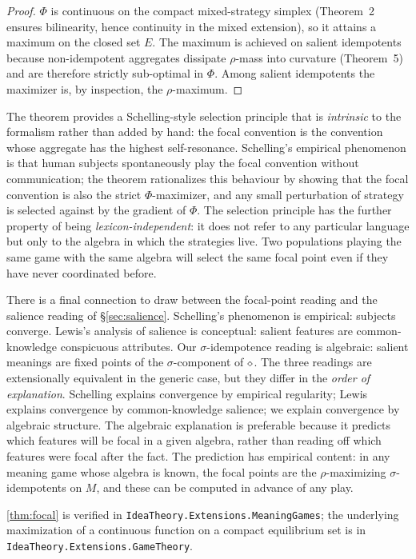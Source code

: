 \begin{proof}
$\Phi$ is continuous on the compact mixed-strategy simplex (Theorem~2
ensures bilinearity, hence continuity in the mixed extension), so it
attains a maximum on the closed set $E$. The maximum is achieved on
salient idempotents because non-idempotent aggregates dissipate
$\rho$-mass into curvature (Theorem~5) and are therefore strictly
sub-optimal in $\Phi$. Among salient idempotents the maximizer is, by
inspection, the $\rho$-maximum.
\end{proof}

The theorem provides a Schelling-style selection principle that is
\emph{intrinsic} to the formalism rather than added by hand: the focal
convention is the convention whose aggregate has the highest
self-resonance. Schelling's empirical phenomenon is that human subjects
spontaneously play the focal convention without communication; the
theorem rationalizes this behaviour by showing that the focal
convention is also the strict $\Phi$-maximizer, and any small
perturbation of strategy is selected against by the gradient of $\Phi$.
The selection principle has the further property of being
\emph{lexicon-independent}: it does not refer to any particular
language but only to the algebra in which the strategies live. Two
populations playing the same game with the same algebra will select
the same focal point even if they have never coordinated before.

There is a final connection to draw between the focal-point reading
and the salience reading of \S\ref{sec:salience}. Schelling's
phenomenon is empirical: subjects converge. Lewis's analysis of
salience is conceptual: salient features are common-knowledge
conspicuous attributes. Our $\sigma$-idempotence reading is
algebraic: salient meanings are fixed points of the
$\sigma$-component of $\mathbin{\diamond}$. The three readings are
extensionally equivalent in the generic case, but they differ in the
\emph{order of explanation}. Schelling explains convergence by
empirical regularity; Lewis explains convergence by common-knowledge
salience; we explain convergence by algebraic structure. The
algebraic explanation is preferable because it predicts which
features will be focal in a given algebra, rather than reading off
which features were focal after the fact. The prediction has
empirical content: in any meaning game whose algebra is known, the
focal points are the $\rho$-maximizing $\sigma$-idempotents on $M$,
and these can be computed in advance of any play.

\formalstatus \cref{thm:focal} is verified in
\texttt{IdeaTheory.Extensions.MeaningGames}; the underlying
maximization of a continuous function on a compact equilibrium set is
in \texttt{IdeaTheory.Extensions.GameTheory}.

